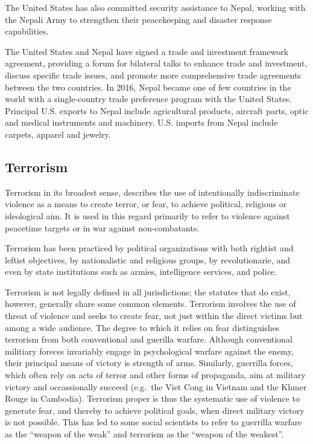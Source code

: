 \documentclass[
  openany]{book}
\begin{document}
The United States has also committed security assistance to Nepal, working with the Nepali Army to strengthen their peacekeeping and disaster response capabilities.

The United States and Nepal have signed a trade and investment framework agreement, providing a forum for bilateral talks to enhance trade and investment, discuss specific trade issues, and promote more comprehensive trade agreements between the two countries. In 2016, Nepal became one of few countries in the world with a single-country trade preference program with the United States. Principal U.S. exports to Nepal include agricultural products, aircraft parts, optic and medical instruments and machinery. U.S. imports from Nepal include carpets, apparel and jewelry.

\hypertarget{terrorism}{%
\subsection{Terrorism}\label{terrorism}}

Terrorism in its broadest sense, describes the use of intentionally indiscriminate violence as a means to create terror, or fear, to achieve political, religious or ideological aim. It is used in this regard primarily to refer to violence against peacetime targets or in war against non-combatants.

Terrorism has been practiced by political organizations with both rightist and leftist objectives, by nationalistic and religious groups, by revolutionarie, and even by state institutions such as armies, intelligence services, and police.

Terrorism is not legally defined in all jurisdictions; the statutes that do exist, however, generally share some common elements. Terrorism involves the use of threat of violence and seeks to create fear, not just within the direct victims but among a wide audience. The degree to which it relies on fear distinguishes terrorism from both conventional and guerilla warfare. Although conventional militiary foreces invariably engage in psychological warfare against the enemy, their principal means of victory is strength of arms. Similarly, guerrilla forces, which often rely on acts of terror and other forms of propaganda, aim at military victory and occassionally succeed (e.g.~the Viet Cong in Vietnam and the Khmer Rouge in Cambodia). Terrorism proper is thus the systematic use of violence to generate fear, and thereby to achieve political goals, when direct military victory is not possible. This has led to some social scientists to refer to guerrilla warfare as the ``weapon of the weak'' and terrorism as the ``weapon of the weakest''.
\end{document}
